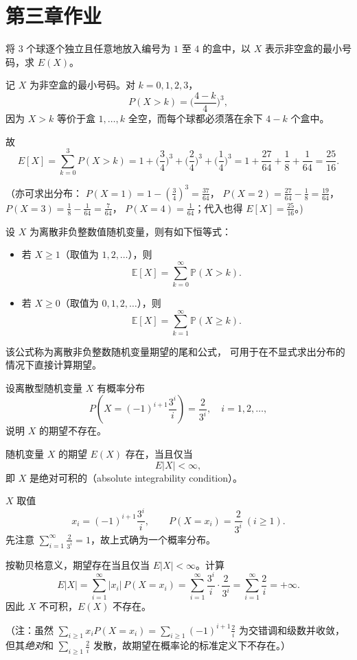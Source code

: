 \chapter{第三章作业}
\begin{homework}[3.3]
将 $3$ 个球逐个独立且任意地放入编号为 $1$ 至 $4$ 的盒中，以 $X$ 表示非空盒的最小号码，求 $E(X)$。
\end{homework}
\begin{solution}
记 $X$ 为非空盒的最小号码。对 $k=0,1,2,3$，
\[
P(X>k)=\Big(\frac{4-k}{4}\Big)^{3},
\]
因为 $X>k$ 等价于盒 $1,\dots,k$ 全空，而每个球都必须落在余下 $4-k$ 个盒中。

故
\[
E[X]=\sum_{k=0}^{3}P(X>k)
=1+\Big(\frac{3}{4}\Big)^3+\Big(\frac{2}{4}\Big)^3+\Big(\frac{1}{4}\Big)^3
=1+\frac{27}{64}+\frac{1}{8}+\frac{1}{64}
=\frac{25}{16}.
\]

（亦可求出分布：
$P(X=1)=1-(\tfrac{3}{4})^3=\tfrac{37}{64}$，
$P(X=2)=\tfrac{27}{64}-\tfrac{1}{8}=\tfrac{19}{64}$，
$P(X=3)=\tfrac{1}{8}-\tfrac{1}{64}=\tfrac{7}{64}$，
$P(X=4)=\tfrac{1}{64}$；代入也得 $E[X]=\tfrac{25}{16}$。)
\end{solution}
\begin{definition}[离散非负整数随机变量的尾和公式]
设 $X$ 为离散非负整数值随机变量，则有如下恒等式：

\begin{itemize}
  \item 若 $X\ge 1$（取值为 $1,2,\dots$），则
  \[
  \mathbb E[X]=\sum_{k=0}^{\infty}\mathbb P(X>k).
  \]

  \item 若 $X\ge 0$（取值为 $0,1,2,\dots$），则
  \[
  \mathbb E[X]=\sum_{k=1}^{\infty}\mathbb P(X\ge k).
  \]
\end{itemize}

该公式称为离散非负整数随机变量期望的尾和公式，
可用于在不显式求出分布的情况下直接计算期望。
\end{definition}
\begin{homework}[3.4]
设离散型随机变量 $X$ 有概率分布
\[
P\!\left(X=(-1)^{i+1}\frac{3^i}{i}\right)=\frac{2}{3^i}, \quad i=1,2,\ldots,
\]
说明 $X$ 的期望不存在。
\end{homework}
\begin{theorem}[期望存在的判别准则]
随机变量 $X$ 的期望 $E(X)$ 存在，当且仅当
\[
E|X| < \infty,
\]
即 $X$ 是绝对可积的（absolute integrability condition）。
\end{theorem}
\begin{solution}
$X$ 取值
\[
x_i = (-1)^{i+1}\frac{3^i}{i}, \qquad P(X=x_i)=\frac{2}{3^i}\ (i\ge1).
\]
先注意 $\sum_{i=1}^\infty \frac{2}{3^i}=1$，故上式确为一个概率分布。

按勒贝格意义，期望存在当且仅当 $E|X|<\infty$。计算
\[
E|X|
=\sum_{i=1}^\infty |x_i|\,P(X=x_i)
=\sum_{i=1}^\infty \frac{3^i}{i}\cdot\frac{2}{3^i}
=\sum_{i=1}^\infty \frac{2}{i}
=+\infty.
\]
因此 $X$ 不可积，$E(X)$ 不存在。

（注：虽然 $\sum_{i\ge1} x_iP(X=x_i)=\sum_{i\ge1}(-1)^{i+1}\frac{2}{i}$ 为交错调和级数并收敛，
但其\emph{绝对}和 $\sum_{i\ge1}\frac{2}{i}$ 发散，故期望在概率论的标准定义下不存在。）
\end{solution}

